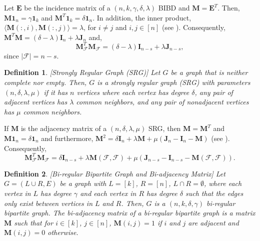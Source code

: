 \documentclass[journal,draftcls,onecolumn]{IEEEtran}
\theoremstyle{mystyle}
\newtheorem{defn}{Definition}
\newcommand{\bfE}{\mathbf{E}}
\newcommand{\bfI}{\mathbf{I}}
\newcommand{\bfM}{\mathbf{M}}
\newcommand{\cF}{\mathcal{F}}
\newcommand{\aditya}[1]{\marginpar{+}{\bf Aditya's remark}: {\em #1}}
\begin{document}
Let $\bfE$ be the incidence matrix of a $(n,k,\gamma, \delta, \lambda)$ BIBD and $\bfM = \bfE^T$. Then,  $\mathbf{M} \mathbf{1}_n = \gamma \mathbf{1}_k$ and $\mathbf{M}^T \mathbf{1}_k = \delta \mathbf{1}_n$. In addition, the inner product, $\langle \mathbf{M}(:,i), \mathbf{M}(:,j)\rangle = \lambda$, for $i \ne j$ and $i, j \in [n]$ (see  \cite{StinsonBook}). Consequently, $\bfM^T\bfM = (\delta - \lambda)\bfI_n + \lambda \mathbf{J}_n$ and, 
\begin{equation} \label{eq: bibd_prop}
\bfM_{\cF}^T\bfM_{\cF} = (\delta - \lambda)\mathbf{I}_{n-s} + \lambda \mathbf{J}_{n-s},
\end{equation}
since $|\mathcal{F}| = n-s$.

\begin{defn} {[{\it Strongly Regular Graph (SRG)}]} Let $G$ be a graph that is neither complete nor empty. Then, $G$ is a strongly regular graph (SRG) with parameters $(n, \delta, \lambda, \mu)$ if it has $n$ vertices where each vertex has degree $\delta$, any pair of adjacent vertices has $\lambda$ common neighbors, and any pair of 
nonadjacent vertices has $\mu$ common neighbors. 
\end{defn}


If $\bfM$ is the adjacency matrix of a $(n, \delta, \lambda, \mu)$ SRG, then
$\mathbf{M} = \mathbf{M}^T$ and $\mathbf{M} \mathbf{1}_n = \delta \mathbf{1}_n$  and furthermore, $\mathbf{M}^2 = \delta \mathbf{I}_n + \lambda \mathbf{M} + \mu (\mathbf{J}_n - \mathbf{I}_n - \mathbf{M})$ (see \cite{Brouwer_SRG}). Consequently, %
\begin{equation}\label{eq: srg_prop}
\mathbf{M}_{\cF}^T\mathbf{M}_{\cF}  = \delta \mathbf{I}_{n-s} + \lambda \mathbf{M}(\cF, \cF) + \mu (\mathbf{J}_{n-s} - \mathbf{I}_{n-s} - \mathbf{M}(\cF, \cF)).
\end{equation}
\begin{defn} {[{\it Bi-regular Bipartite Graph and Bi-adjacency Matrix}]}
Let $G = (L \cup R, E)$ be a graph with $L = [k]$, $R = [n]$, $L \cap R = \emptyset$, where each vertex in $L$ has degree $\gamma$ and each vertex in $R$ has degree $\delta$ such that the edges only exist between vertices in $L$ and $R$. Then, $G$ is a $(n,k,\delta, \gamma)$ bi-regular bipartite graph. The bi-adjacency matrix of a bi-regular bipartite graph is a matrix $\mathbf{M}$ such that for $i \in [k]$, $j \in [n]$, $\mathbf{M}(i,j) = 1$ if $i$ and $j$ are adjacent and $\mathbf{M}(i,j) = 0$ otherwise.   
\end{defn}
\end{document}
